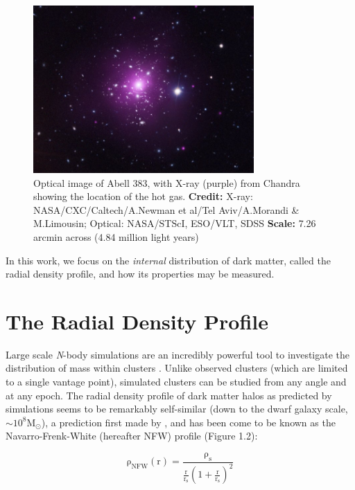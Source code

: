 \begin{figure}
  \centering
  \includegraphics[width=0.75\textwidth]{images/Introduction/abell383.jpg}
  \caption[X-ray Gas in Abell 383]{Optical image of Abell 383, with X-ray (purple) from Chandra showing the location of the hot gas. {\bf Credit: } X-ray: NASA/CXC/Caltech/A.Newman et al/Tel Aviv/A.Morandi \& M.Limousin; Optical: NASA/STScI, ESO/VLT, SDSS {\bf Scale: } 7.26 arcmin across (4.84 million light years)}
\end{figure}

In this work, we focus on the {\em internal} distribution of dark matter, called the radial density profile, and how its properties may be measured. 

\section{The Radial Density Profile}
Large scale {\em N}-body simulations are an incredibly powerful tool to investigate the distribution of mass within clusters \citep{NFW1996,BU01.1,SP05.1,KL11.1,PradaEtAl2012}. Unlike observed clusters (which are limited to a single vantage point), simulated clusters can be studied from any angle and at any epoch. The radial density profile of dark matter halos as predicted by simulations seems to be remarkably self-similar (down to the dwarf galaxy scale, $\mathrm{\sim 10^{8} M_{\odot}}$), a prediction first made by \citet{NFW1996}, and has been come to be known as the Navarro-Frenk-White (hereafter NFW) profile (Figure 1.2):

\begin{equation}
\mathrm{ \rho_{NFW} (r) = \frac{\rho_{s}}{\frac{r}{r_{s}} \left( 1+ \frac{r}{r_{s}}\right)^{2}} }
\end{equation}

